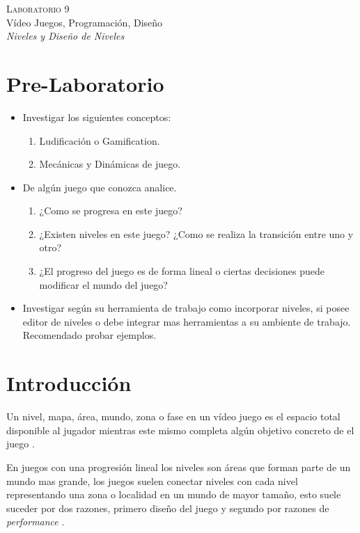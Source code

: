 \begin{center}
\textsc{\Large Laboratorio 9}~\\
{\large Vídeo Juegos, Programación, Diseño}~\\
\emph{Niveles y Diseño de Niveles}
\end{center}

\section{Pre-Laboratorio}
\begin{itemize}
\item Investigar los siguientes conceptos:
\begin{enumerate}
  \item Ludificación o Gamification.
  \item Mecánicas y Dinámicas de juego.
\end{enumerate}
\item De algún juego que conozca analice.
\begin{enumerate}
  \item ¿Como se progresa en este juego?
  \item ¿Existen niveles en este juego? ¿Como se realiza la transición entre uno y otro?
  \item ¿El progreso del juego es de forma lineal o ciertas decisiones puede modificar el mundo del juego?
\end{enumerate}
\item Investigar según su herramienta de trabajo como incorporar niveles, si posee editor de niveles o debe integrar mas herramientas a su ambiente de trabajo. Recomendado probar ejemplos.
\end{itemize}

\section{Introducción}
Un nivel, mapa, área, mundo, zona o fase en un vídeo juego es el espacio total disponible al jugador  mientras este mismo completa algún objetivo concreto de el juego \cite[p.~107]{bobbatesgamedesign}.

En juegos con una progresión lineal los niveles son áreas que forman parte de un mundo mas grande, los juegos suelen conectar niveles con cada nivel representando una zona o localidad en un mundo de mayor tamaño, esto suele suceder por dos razones, primero diseño del juego y segundo por razones de \emph{performance} \cite[p.~104]{jenkinscreatinggames}.

